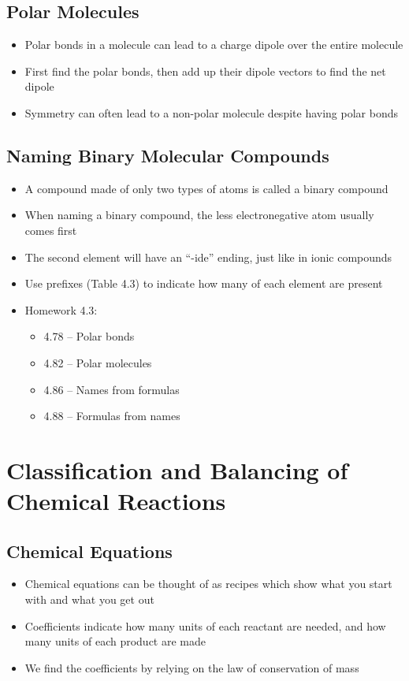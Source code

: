 \documentclass[12pt, openany, letterpaper]{memoir}
\begin{document}
\section{Polar Molecules}
\begin{itemize}
	\item Polar bonds in a molecule can lead to a charge dipole over the entire molecule
	\item First find the polar bonds, then add up their dipole vectors to find the net dipole
	\item Symmetry can often lead to a non-polar molecule despite having polar bonds
\end{itemize}
\section{Naming Binary Molecular Compounds}
\begin{itemize}
	\item A compound made of only two types of atoms is called a binary compound
	\item When naming a binary compound, the less electronegative atom usually comes first
	\item The second element will have an ``-ide'' ending, just like in ionic compounds
	\item Use prefixes (Table 4.3) to indicate how many of each element are present
	\item Homework 4.3:
	\begin{itemize}
		\item 4.78 -- Polar bonds
		\item 4.82 -- Polar molecules
		\item 4.86 -- Names from formulas
		\item 4.88 -- Formulas from names
	\end{itemize}
\end{itemize}

\chapter{Classification and Balancing of Chemical Reactions}
\section{Chemical Equations}
\begin{itemize}
	\item Chemical equations can be thought of as recipes which show what you start with and what you get out
	\item Coefficients indicate how many units of each reactant are needed, and how many units of each product are made
	\item We find the coefficients by relying on the law of conservation of mass
\end{itemize}
\end{document}
